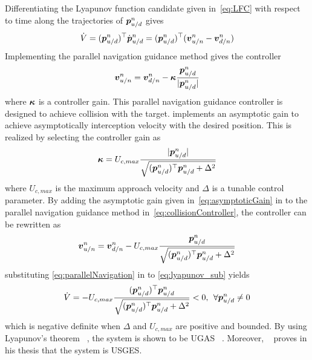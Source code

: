 Differentiating the Lyapunov function candidate given in~\ref{eq:LFC} with respect to time along the trajectories of $\boldsymbol{p}_{u/d}^{n}$ gives
\begin{equation}\label{eq:lyapunov_sub}
	\dot{V}=(\boldsymbol{p}_{u/d}^{n})^{\top}\dot{\boldsymbol{p}}_{u/d}^{n}=(\boldsymbol{p}_{u/d}^{n})^{\top}(\boldsymbol{v}^n_{u/n}-\boldsymbol{v}_{d/n}^n)
\end{equation}
Implementing the parallel navigation guidance method gives the controller
\begin{equation}\label{eq:collisionController}
	\boldsymbol{v}_{u/n}^n=\boldsymbol{v}_{d/n}^n-\boldsymbol{\kappa}\frac{\boldsymbol{p}_{u/d}^{n}}{|\boldsymbol{p}_{u/d}^{n}|}
\end{equation}
where $\boldsymbol{\kappa}$ is a controller gain. This parallel navigation guidance controller is designed to achieve collision with the target. \cite{BREIVIK2007349} implements an asymptotic gain to achieve asymptotically interception velocity with the desired position. This is realized by selecting the controller gain as
\begin{equation}\label{eq:asymptoticGain}
	\boldsymbol{\kappa}=U_{c,max}\frac{|\boldsymbol{p}_{u/d}^{n}|}{\sqrt{(\boldsymbol{p}_{u/d}^{n})^{\top}\boldsymbol{p}_{u/d}^{n}+\Delta^2}}
\end{equation}
where $U_{c,max}$ is the maximum approach velocity and $\Delta$ is a tunable control parameter. By adding the asymptotic gain given in~\ref{eq:asymptoticGain} in to the parallel navigation guidance method in~\ref{eq:collisionController}, the controller can be rewritten as
\begin{equation}\label{eq:parallelNavigation}
	\boldsymbol{v}_{u/n}^n=\boldsymbol{v}_{d/n}^{n}-U_{c,max}\frac{\boldsymbol{p}_{u/d}^{n}}{\sqrt{(\boldsymbol{p}_{u/d}^{n})^{\top}\boldsymbol{p}_{u/d}^{n}+\Delta^2}}
\end{equation}
substituting \ref{eq:parallelNavigation} in to \ref{eq:lyapunov_sub} yields
\begin{equation}
	\dot{V}=-U_{c,max}\frac{(\boldsymbol{p}_{u/d}^{n})^{\top}\boldsymbol{p}_{u/d}^{n}}{\sqrt{(\boldsymbol{p}_{u/d}^{n})^{\top}\boldsymbol{p}_{u/d}^{n}+\Delta^2}}<0,\:\: \forall \boldsymbol{p}_{u/d}^{n}\ne0
\end{equation}
which is negative definite when $\Delta$ and $U_{c,max}$ are positive and bounded. By using Lyapunov's theorem ~\citep{KhalilHassanK2015Ns}, the system is shown to be \gls{UGAS} ~\citep{Fossen2011}. Moreover, ~\citet{belleter2016control} proves in his thesis that the system is \gls{USGES}.


